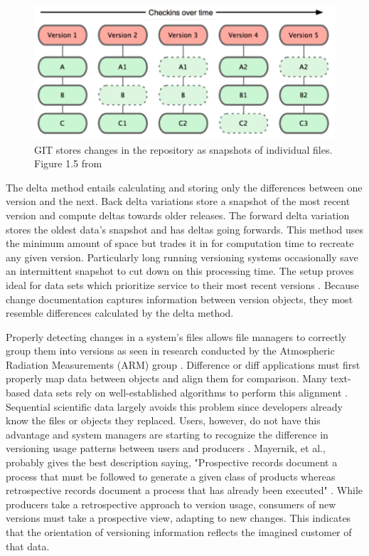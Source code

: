 \begin{figure}
	\centering
	\includegraphics[scale=0.50]{figures/GITFiles.png}
	\caption[GIT stores changes in the repository as snapshots of individual files.]{GIT stores changes in the repository as snapshots of individual files. Figure 1.5 from \cite{Chacon:2009:PG:1618548}}
	\label{GITFile}
\end{figure}

The delta method entails calculating and storing only the differences between one version and the next.
Back delta variations store a snapshot of the most recent version and compute deltas towards older releases.
The forward delta variation stores the oldest data's snapshot and has deltas going forwards.
This method uses the minimum amount of space but trades it in for computation time to recreate any given version.
Particularly long running versioning systems occasionally save an intermittent snapshot to cut down on this processing time.
The setup proves ideal for data sets which prioritize service to their most recent versions \cite{Stuckenholz:2005:CEV:1039174.1039197}.
Because change documentation captures information between version objects, they most resemble differences calculated by the delta method.

Properly detecting changes in a system's files allows file managers to correctly group them into versions as seen in research conducted by the Atmospheric Radiation Measurements (ARM) group \cite{6906868}.
Difference or diff applications must first properly map data between objects and align them for comparison.
Many text-based data sets rely on well-established algorithms to perform this alignment  \cite{Chien:2000:VMX:646544.696357} \cite{Hartung201315}.
Sequential scientific data largely avoids this problem since developers already know the files or objects they replaced.
Users, however, do not have this advantage and system managers are starting to recognize the difference in versioning usage patterns between users and producers \cite{Branco2008}.
Mayernik, et al., probably gives the best description saying, "Prospective records document a process that must be followed to generate a given class of products whereas retrospective records document a process that has already been executed" \cite{MatthewS.Mayernik201312-039}.
While producers take a retrospective approach to version usage, consumers of new versions must take a prospective view, adapting to new changes.
This indicates that the orientation of versioning information reflects the imagined customer of that data.


